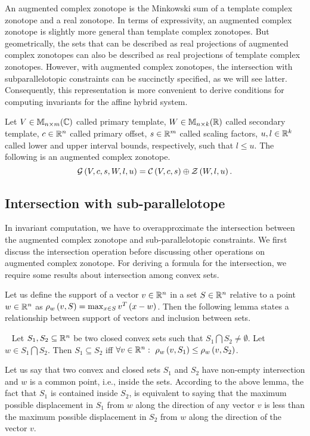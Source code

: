 An augmented complex zonotope is the Minkowski sum of a template
complex zonotope and a real zonotope. In terms of expressivity, an
augmented complex zonotope is slightly more general than template
complex zonotopes.  But geometrically, the sets that can be described
as real projections of augmented complex zonotopes can also be
described as real projections of template complex zonotopes.  However,
with augmented complex zonotopes, the intersection with
subparallelotopic constraints can be succinctly specified, as we will
see latter. Consequently, this representation is more convenient to
derive conditions for computing invariants for the affine hybrid
system.
%
\begin{definition}
Let $V\in\mathbb{M}_{n\times m}(\mathbb{C})$ called primary template, $W\in\mathbb{M}_{n\times k}(\mathbb{R})$
called secondary template, $c\in\mathbb{R}^n$ called primary offset,
$s\in\mathbb{R}^m$ called scaling factors, $u,l\in\mathbb{R}^k$ called lower
and upper interval bounds, respectively, such that $l\leq u$.  The
following is an augmented complex
zonotope.
\begin{equation*}
\mathcal{G}\left(V,c,s,W,l,u\right) = \mathcal{C}\left(V,c,s\right)\oplus\mathcal{Z}\left(W,l,u\right).
\end{equation*}
\end{definition}
%
\subsection{Intersection with sub-parallelotope}
In invariant computation, we have to overapproximate the intersection
between the augmented complex zonotope and sub-parallelotopic
constraints.  We first discuss the intersection operation before
discussing other operations on augmented complex zonotope.  For
deriving a formula for the intersection, we require some results about
intersection among convex sets.  

Let us define the support of a vector $v\in\mathbb{R}^n$ in a set
$S\in\mathbb{R}^n$ relative to a point $w\in\mathbb{R}^n$ as
$\rho_{w}\left(v,S\right)=\max_{x\in S}v^T\left(x-w\right)$.   Then the following
lemma states a relationship between support of vectors and inclusion
between sets.
%
\begin{lemma}~\label{supp-inclusion}
Let $S_1,S_2\subseteq \mathbb{R}^n$ be two closed convex sets such that
$S_1\bigcap S_2\neq \emptyset$.  Let $w\in S_1\bigcap S_2$.
Then $S_1\subseteq S_2$ iff $\forall
v\in\mathbb{R}^n:~\rho_{w}\left(v,S_1\right)\leq \rho_{w}\left(v,S_2\right)$.
\end{lemma}
Let us say that two convex and closed sets $S_1$ and $S_2$ have
non-empty intersection and $w$ is a common point, i.e., inside the
sets.  According to the above lemma, the fact that $S_1$ is contained
inside $S_2$, is equivalent to saying that the maximum possible
displacement in $S_1$ from $w$ along the direction of any
vector $v$ is less than the maximum possible displacement in $S_2$
from $w$ along the direction of the vector $v$.

